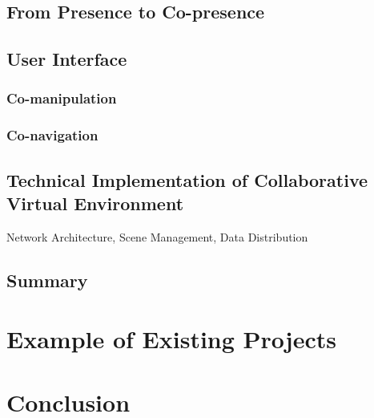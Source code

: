 \subsection{From Presence to Co-presence}

\subsection{User Interface}
\subsubsection{Co-manipulation}
\subsubsection{Co-navigation}

\subsection{Technical Implementation of Collaborative Virtual Environment}
Network Architecture, Scene Management, Data Distribution

\subsection{Summary}

\section{Example of Existing Projects}


\section{Conclusion}

